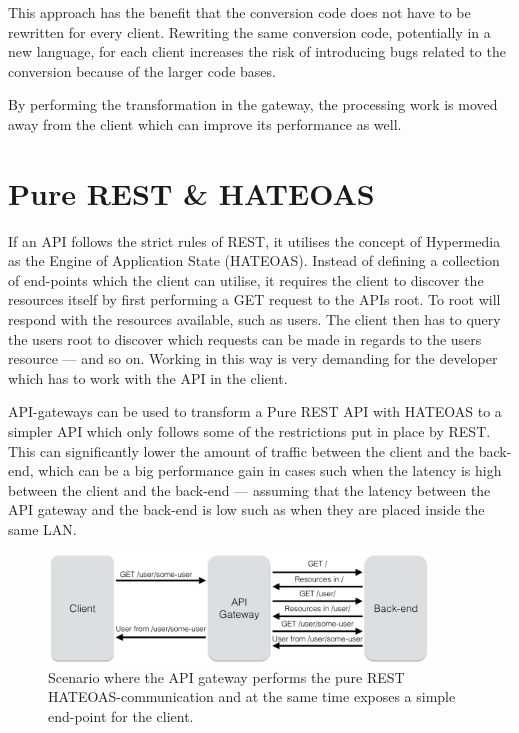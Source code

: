 \documentclass{cslthse-msc}
\begin{document}
This approach has the benefit that the conversion code does not have to be rewritten for every client. Rewriting the same conversion code, potentially in a new language, for each client increases the risk of introducing bugs related to the conversion because of the larger code bases\cite{code_complete}. 

By performing the transformation in the gateway, the processing work is moved away from the client which can improve its performance as well.

\section{Pure REST \& HATEOAS}
If an API follows the strict rules of REST, it utilises the concept of Hypermedia as the Engine of Application State (HATEOAS). Instead of defining a collection of end-points which the client can utilise, it requires the client to discover the resources itself by first performing a GET request to the APIs root. To root will respond with the resources available, such as users. The client then has to query the users root to discover which requests can be made in regards to the users resource --- and so on. Working in this way is very demanding for the developer which has to work with the API in the client\cite[page 61]{AASG}.

API-gateways can be used to transform a Pure REST API with HATEOAS to a simpler API which only follows some of the restrictions put in place by REST. This can significantly lower the amount of traffic between the client and the back-end, which can be a big performance gain in cases such when the latency is high between the client and the back-end --- assuming that the latency between the API gateway and the back-end is low such as when they are placed inside the same LAN.

\begin{figure}[H]
  \centering
    \begin{center}
      \includegraphics[width=0.9\textwidth]{images/api_gateway_hateoas.png}
    \end{center}
  \caption{Scenario where the API gateway performs the pure REST HATEOAS-communication and at the same time exposes a simple end-point for the client.}
\end{figure}
\end{document}
